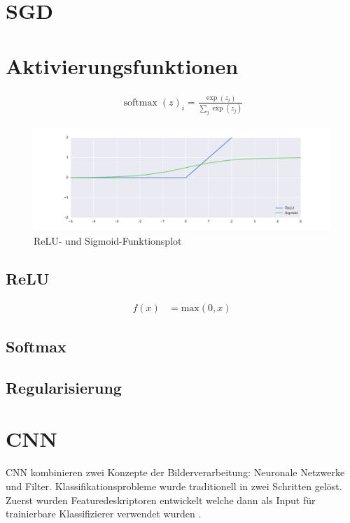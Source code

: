 \section{SGD}

\section{Aktivierungsfunktionen}
\begin{align}
    \operatorname{softmax}(z)_{i}=\frac{\exp\left(z_{i}\right)}{ \sum _ { j } \exp \left( z _ { j } \right) }
\end{align}
\begin{figure}
    \caption{ReLU- und Sigmoid-Funktionsplot}
    \includegraphics[width=\textwidth]{figures/plot/relu_sigmoid.pdf}
\end{figure}

\subsection{ReLU}
\begin{align}
    f\left(x\right) &= \text{max}(0,x)
\end{align}
\subsection{Softmax}

\subsection{Regularisierung}
\label{sec:Regularisierung}

\section{CNN}
CNN kombinieren zwei Konzepte der Bilderverarbeitung: Neuronale Netzwerke und Filter.
Klassifikationsprobleme wurde traditionell in zwei Schritten gelöst. Zuerst wurden 
Featuredeskriptoren entwickelt welche dann als Input für trainierbare Klassifizierer 
verwendet wurden \autocite[2353]{RawatDeepConvolutionalNeural2017}.


